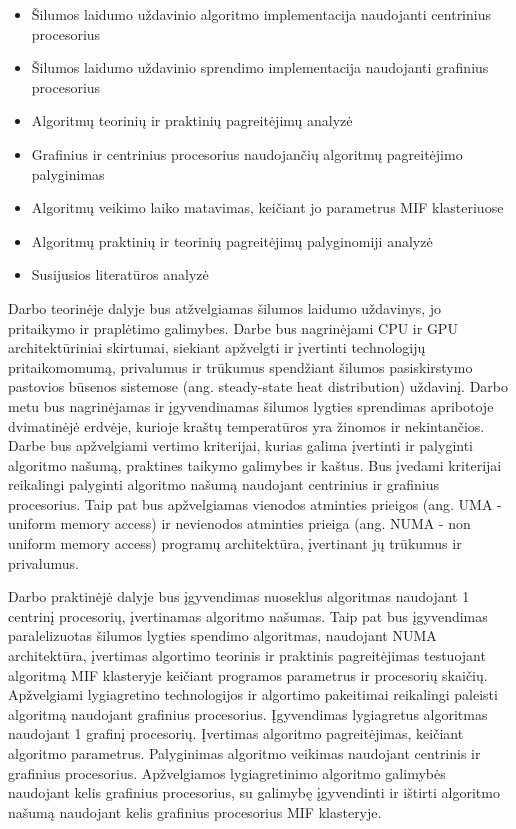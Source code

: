 \documentclass{VUMIFPSbakalaurinis}
\begin{document}
\begin{itemize}
    \item Šilumos laidumo uždavinio algoritmo implementacija naudojanti centrinius procesorius
    \item Šilumos laidumo uždavinio sprendimo implementacija naudojanti grafinius procesorius
    \item Algoritmų teorinių ir praktinių pagreitėjimų analyzė
    \item Grafinius ir centrinius procesorius naudojančių algoritmų pagreitėjimo palyginimas
\end{itemize}
\begin{itemize}
    \item Algoritmų veikimo laiko matavimas, keičiant jo parametrus MIF klasteriuose
    \item Algoritmų praktinių ir teorinių pagreitėjimų palyginomiji analyzė
    \item Susijusios literatūros analyzė
\end{itemize}


Darbo teorinėje dalyje bus atžvelgiamas šilumos laidumo uždavinys, jo pritaikymo ir praplėtimo galimybes.
Darbe bus nagrinėjami CPU ir GPU architektūriniai skirtumai, siekiant apžvelgti ir įvertinti technologijų pritaikomomumą, privalumus ir trūkumus spendžiant šilumos pasiskirstymo pastovios būsenos sistemose (ang. steady-state heat distribution) uždavinį.
Darbo metu bus nagrinėjamas ir įgyvendinamas šilumos lygties sprendimas apribotoje dvimatinėjė erdvėje, kurioje kraštų temperatūros yra žinomos ir nekintančios.
Darbe bus apžvelgiami vertimo kriterijai, kurias galima įvertinti ir palyginti algoritmo našumą, praktines taikymo galimybes ir kaštus. Bus įvedami kriterijai reikalingi palyginti algoritmo našumą naudojant centrinius ir grafinius procesorius.
Taip pat bus apžvelgiamas vienodos atminties prieigos (ang. UMA - uniform memory access) \cite{rogers2013amd} \cite{bader2001using} ir nevienodos atminties prieiga (ang. NUMA - non uniform memory access) \cite{lameter2013overview} programų architektūra, įvertinant jų trūkumus ir privalumus. 

Darbo praktinėjė dalyje bus įgyvendimas nuoseklus algoritmas naudojant 1 centrinį procesorių, įvertinamas algoritmo našumas. 
Taip pat bus įgyvendimas paralelizuotas šilumos lygties spendimo algoritmas, naudojant NUMA architektūra, įvertimas algortimo teorinis ir praktinis pagreitėjimas testuojant algoritmą MIF klasteryje keičiant programos parametrus ir procesorių skaičių.
Apžvelgiami lygiagretino technologijos ir algortimo pakeitimai reikalingi paleisti algoritmą naudojant grafinius procesorius. Įgyvendimas lygiagretus algoritmas naudojant 1 grafinį procesorių. Įvertimas algoritmo pagreitėjimas, keičiant algoritmo parametrus. 
Palyginimas algoritmo veikimas naudojant centrinis ir grafinius procesorius. Apžvelgiamos lygiagretinimo algoritmo galimybės naudojant kelis grafinius procesorius, su galimybę įgyvendinti ir ištirti algoritmo našumą naudojant kelis grafinius procesorius MIF klasteryje.
\end{document}
